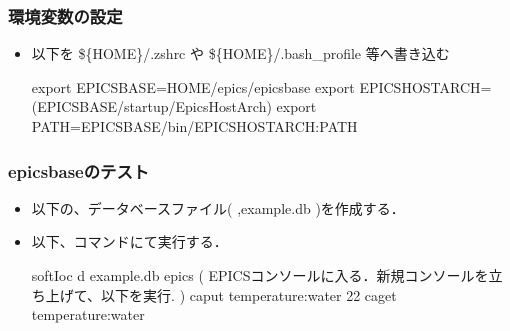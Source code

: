 \documentclass[letterpaper,10pt,dvipdfmx]{sphinxmanual}
\begin{document}
\subsubsection{環境変数の設定}
\label{\detokenize{epics/rst/basic_startup:id2}}\begin{itemize}
\item {} 
以下を \$\{HOME\}/.zshrc や \$\{HOME\}/.bash\_profile 等へ書き込む

\begin{sphinxVerbatim}[commandchars=\\\{\}]
export EPICS\PYGZus{}BASE=\PYGZdl{}\PYGZob{}HOME\PYGZcb{}/epics/epics\PYGZhy{}base
export EPICS\PYGZus{}HOST\PYGZus{}ARCH=\PYGZdl{}(\PYGZdl{}\PYGZob{}EPICS\PYGZus{}BASE\PYGZcb{}/startup/EpicsHostArch)
export PATH=\PYGZdl{}\PYGZob{}EPICS\PYGZus{}BASE\PYGZcb{}/bin/\PYGZdl{}\PYGZob{}EPICS\PYGZus{}HOST\PYGZus{}ARCH\PYGZcb{}:\PYGZdl{}\PYGZob{}PATH\PYGZcb{}
\end{sphinxVerbatim}

\end{itemize}


\subsubsection{epics\sphinxhyphen{}baseのテスト}
\label{\detokenize{epics/rst/basic_startup:epics-base}}\begin{itemize}
\item {} 
以下の、データベースファイル(  ,example.db )を作成する．

\begin{sphinxVerbatim}[commandchars=\\\{\}]
 
   
\end{sphinxVerbatim}

\item {} 
以下、コマンドにて実行する．

\begin{sphinxVerbatim}[commandchars=\\\{\}]
\PYGZdl{} softIoc \PYGZhy{}d example.db
epics\PYGZgt{}
( EPICSコンソールに入る．新規コンソールを立ち上げて、以下を実行. )
\PYGZdl{} caput temperature:water 22
\PYGZdl{} caget temperature:water
\end{sphinxVerbatim}

\end{itemize}
\end{document}

